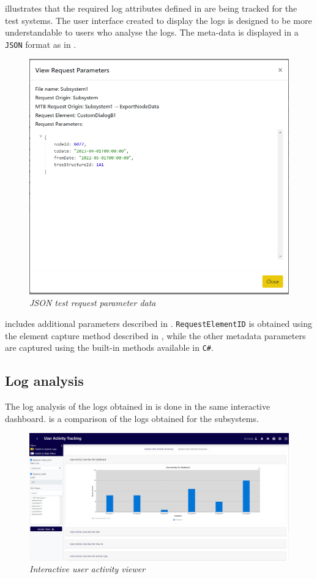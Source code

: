  illustrates that the required log attributes defined in  are being tracked for the test systems. The user interface created to display the logs is designed to be more understandable to users who analyse the logs. The meta-data is displayed in a \texttt{JSON} format as in .

\clearpage

\begin{figure}[!htb]
	\centering %
	\includegraphics[width=0.65\linewidth]{img/ch3/analysis/UAT_request_params.png}
	\caption[JSON test request parameter data]
	{\textit{JSON test request parameter data}}\label{fig:ch3_JSON_Test_Result}
\end{figure}

 includes additional parameters described in . \texttt{RequestElementID} is obtained using the element capture method described in , while the other metadata parameters are captured using the built-in methods available in \texttt{C\#}.

\subsection{Log analysis}
The log analysis of the logs obtained in  is done in the same interactive dashboard.  is a comparison of the logs obtained for the subsystems.

\begin{figure}[!htb]
	\centering %
	\includegraphics[width=0.99\linewidth]{img/ch3/analysis/UAT_menu_analysis.png}
	\caption[Interactive user activity viewer]
	{\textit{Interactive user activity viewer}}\label{fig:ch3_UAT_menuAnalysis}
\end{figure}

